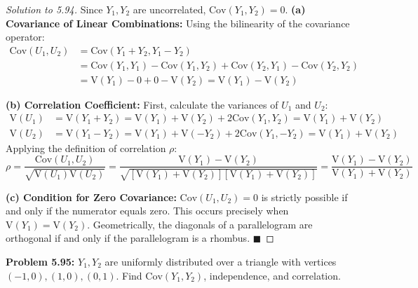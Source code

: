 \documentclass[11pt, a4paper]{article}
\theoremstyle{definition}
\theoremstyle{remark}
\newcommand{\Cov}{\mathrm{Cov}}
\newcommand{\Var}{\mathrm{V}}
\begin{document}
\begin{proof}[Solution to 5.94]
Since $Y_1, Y_2$ are uncorrelated, $\Cov(Y_1, Y_2) = 0$.
\textbf{(a) Covariance of Linear Combinations:}
Using the bilinearity of the covariance operator:
\begin{align*}
\Cov(U_1, U_2) &= \Cov(Y_1 + Y_2, Y_1 - Y_2) \\
&= \Cov(Y_1, Y_1) - \Cov(Y_1, Y_2) + \Cov(Y_2, Y_1) - \Cov(Y_2, Y_2) \\
&= \Var(Y_1) - 0 + 0 - \Var(Y_2) = \Var(Y_1) - \Var(Y_2)
\end{align*}

\textbf{(b) Correlation Coefficient:}
First, calculate the variances of $U_1$ and $U_2$:
\begin{align*}
\Var(U_1) &= \Var(Y_1 + Y_2) = \Var(Y_1) + \Var(Y_2) + 2\Cov(Y_1,Y_2) = \Var(Y_1) + \Var(Y_2) \\
\Var(U_2) &= \Var(Y_1 - Y_2) = \Var(Y_1) + \Var(-Y_2) + 2\Cov(Y_1,-Y_2) = \Var(Y_1) + \Var(Y_2)
\end{align*}
Applying the definition of correlation $\rho$:
\[
\rho = \frac{\Cov(U_1, U_2)}{\sqrt{\Var(U_1)\Var(U_2)}} = \frac{\Var(Y_1) - \Var(Y_2)}{\sqrt{[\Var(Y_1) + \Var(Y_2)][\Var(Y_1) + \Var(Y_2)]}} = \frac{\Var(Y_1) - \Var(Y_2)}{\Var(Y_1) + \Var(Y_2)}
\]

\textbf{(c) Condition for Zero Covariance:}
$\Cov(U_1, U_2) = 0$ is strictly possible if and only if the numerator equals zero. This occurs precisely when $\Var(Y_1) = \Var(Y_2)$. Geometrically, the diagonals of a parallelogram are orthogonal if and only if the parallelogram is a rhombus. $\blacksquare$
\end{proof}

\vspace{1em}
\noindent\textbf{Problem 5.95:} $Y_1, Y_2$ are uniformly distributed over a triangle with vertices $(-1,0), (1,0), (0,1)$. Find $\Cov(Y_1, Y_2)$, independence, and correlation.
\end{document}
